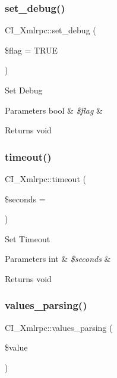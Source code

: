 \subsubsection{\texorpdfstring{set\+\_\+debug()}{set\_debug()}}
{\footnotesize\ttfamily C\+I\+\_\+\+Xmlrpc\+::set\+\_\+debug (\begin{DoxyParamCaption}\item[{}]{\$flag = {\ttfamily TRUE} }\end{DoxyParamCaption})}

Set Debug


\begin{DoxyParams}[1]{Parameters}
bool & {\em \$flag} & \\
\hline
\end{DoxyParams}
\begin{DoxyReturn}{Returns}
void 
\end{DoxyReturn}
\mbox{\label{class_c_i___xmlrpc_ad6355d060369ed4bebf4acc7aea3b81f}} 
\subsubsection{\texorpdfstring{timeout()}{timeout()}}
{\footnotesize\ttfamily C\+I\+\_\+\+Xmlrpc\+::timeout (\begin{DoxyParamCaption}\item[{}]{\$seconds = {} }\end{DoxyParamCaption})}

Set Timeout


\begin{DoxyParams}[1]{Parameters}
int & {\em \$seconds} & \\
\hline
\end{DoxyParams}
\begin{DoxyReturn}{Returns}
void 
\end{DoxyReturn}
\mbox{\label{class_c_i___xmlrpc_a44b4fc10779a9a668bf47e62c128217c}} 
\subsubsection{\texorpdfstring{values\+\_\+parsing()}{values\_parsing()}}
{\footnotesize\ttfamily C\+I\+\_\+\+Xmlrpc\+::values\+\_\+parsing (\begin{DoxyParamCaption}\item[{}]{\$value }\end{DoxyParamCaption})}


